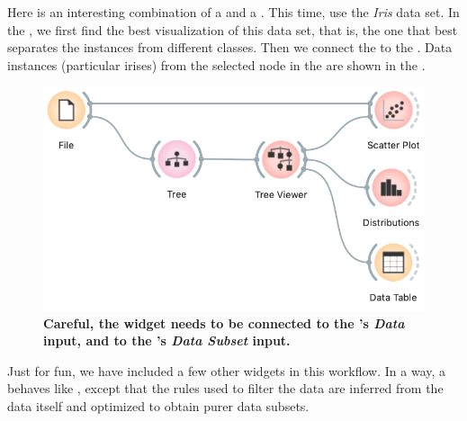 Here is an interesting combination of a  and a . This time, use the \textit{Iris} data set. In the , we first find the best visualization of this data set, that is, the one that best separates the instances from different classes. Then we connect the  to the . Data instances (particular irises) from the selected node in the  are shown in the .

\begin{figure}[h]
    \centering
    \includegraphics[scale=0.4]{workflow-inspection.png}
    \caption{\textbf{\textsf{Careful, the  widget needs to be connected to the 's \textit{Data} input, and  to the 's \textit{Data Subset} input.}}}
\end{figure}

Just for fun, we have included a few other widgets in this workflow. In a way, a  behaves like , except that the rules used to filter the data are inferred from the data itself and optimized to obtain purer data subsets.

